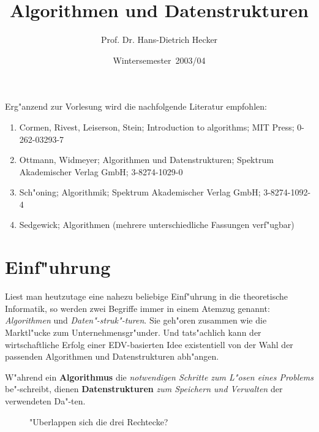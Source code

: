 \documentclass[draft,12pt]{scrreprt}
\theoremstyle{break}
\begin{document}

\author{Prof. Dr. Hans-Dietrich Hecker}
\title{Algorithmen und Datenstrukturen}
\date{Wintersemester~2003/04}
\maketitle
						
\tableofcontents 
{}


Erg"anzend zur Vorlesung wird die nachfolgende Literatur empfohlen:

\begin{enumerate}
 \item Cormen, Rivest, Leiserson, Stein; Introduction to algorithms; MIT Press; 0-262-03293-7
 \item Ottmann, Widmeyer; Algorithmen und Datenstrukturen; Spektrum Akademischer Verlag GmbH; 3-8274-1029-0
 \item Sch"oning; Algorithmik; Spektrum Akademischer Verlag GmbH; 3-8274-1092-4
 \item Sedgewick; Algorithmen (mehrere unterschiedliche Fassungen verf"ugbar)
\end{enumerate}

\chapter{Einf"uhrung}

Liest man heutzutage eine nahezu beliebige Einf"uhrung in die theoretische
Informatik, so werden zwei Begriffe immer in einem Atemzug genannt:
\textit{Algorithmen} und \textit{Daten"-struk"-turen}. Sie geh"oren zusammen
wie die Marktl"ucke zum Unternehmensgr"under. Und tats"achlich kann der 
wirtschaftliche Erfolg einer EDV-basierten Idee existentiell von der Wahl
der passenden Algorithmen und Datenstrukturen abh"angen.

W"ahrend ein \textbf{Algorithmus} die \emph{notwendigen Schritte zum L"osen
eines Problems} be"-schreibt, dienen \textbf{Datenstrukturen}
\emph{zum Speichern und Verwalten} der verwendeten Da"-ten.  

\begin{figure}
  \begin{center}\end{center}

  \caption{"Uberlappen sich die drei Rechtecke?}
  \label{131003a}
\end{figure}
\end{document}
